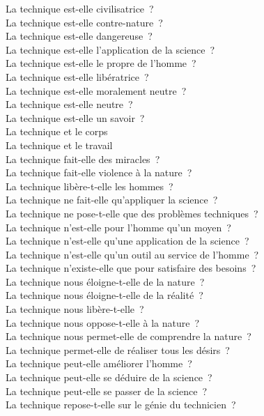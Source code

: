 \documentclass[a4paper,12pt]{article}
\begin{document}
La technique est-elle civilisatrice ? \\
La technique est-elle contre-nature ? \\
La technique est-elle dangereuse ? \\
La technique est-elle l'application de la science ? \\
La technique est-elle le propre de l'homme ? \\
La technique est-elle libératrice ? \\
La technique est-elle moralement neutre ? \\
La technique est-elle neutre ? \\
La technique est-elle un savoir ? \\
La technique et le corps \\
La technique et le travail \\
La technique fait-elle des miracles ? \\
La technique fait-elle violence à la nature ? \\
La technique libère-t-elle les hommes ? \\
La technique ne fait-elle qu'appliquer la science ? \\
La technique ne pose-t-elle que des problèmes techniques ? \\
La technique n'est-elle pour l'homme qu'un moyen ? \\
La technique n'est-elle qu'une application de la science ? \\
La technique n'est-elle qu'un outil au service de l'homme ? \\
La technique n'existe-elle que pour satisfaire des besoins ? \\
La technique nous éloigne-t-elle de la nature ? \\
La technique nous éloigne-t-elle de la réalité ? \\
La technique nous libère-t-elle ? \\
La technique nous oppose-t-elle à la nature ? \\
La technique nous permet-elle de comprendre la nature ? \\
La technique permet-elle de réaliser tous les désirs ? \\
La technique peut-elle améliorer l'homme ? \\
La technique peut-elle se déduire de la science ? \\
La technique peut-elle se passer de la science ? \\
La technique repose-t-elle sur le génie du technicien ? \\
\end{document}
